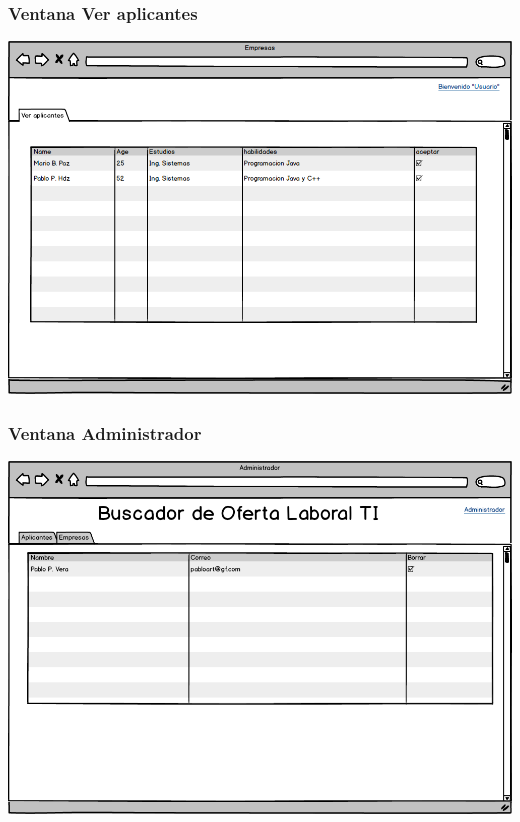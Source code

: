 \frame
{
  \frametitle{  Ventana Ver aplicantes}
  \begin{center}
		\includegraphics[scale=0.28]{./resources/14verapicantes.png}
  \end{center}
}

\frame
{
  \frametitle{  Ventana Administrador}
  \begin{center}
		\includegraphics[scale=0.28]{./resources/15adm.png}
  \end{center}
}